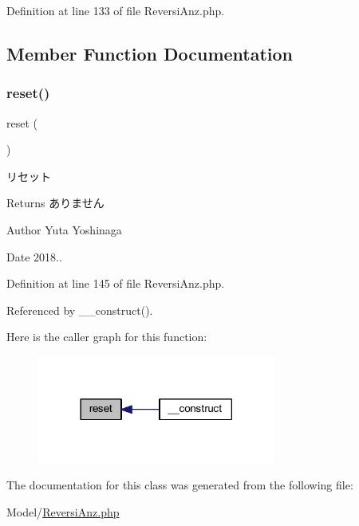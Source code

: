 Definition at line 133 of file Reversi\+Anz.\+php.



\subsection{Member Function Documentation}
\mbox{\label{class_reversi_anz_a4a20559544fdf4dcb457e258dc976cf8}} 
\subsubsection{\texorpdfstring{reset()}{reset()}}
{\footnotesize\ttfamily reset (\begin{DoxyParamCaption}{ }\end{DoxyParamCaption})}



リセット 

\begin{DoxyReturn}{Returns}
ありません 
\end{DoxyReturn}
\begin{DoxyAuthor}{Author}
Yuta Yoshinaga 
\end{DoxyAuthor}
\begin{DoxyDate}{Date}
2018.. 
\end{DoxyDate}


Definition at line 145 of file Reversi\+Anz.\+php.



Referenced by \+\_\+\+\_\+construct().

Here is the caller graph for this function\+:\nopagebreak
\begin{figure}[H]
\begin{center}
\leavevmode
\includegraphics[width=222pt]{class_reversi_anz_a4a20559544fdf4dcb457e258dc976cf8_icgraph}
\end{center}
\end{figure}


The documentation for this class was generated from the following file\+:\begin{DoxyCompactItemize}
\item 
Model/\hyperlink{_reversi_anz_8php}{Reversi\+Anz.\+php}\end{DoxyCompactItemize}
